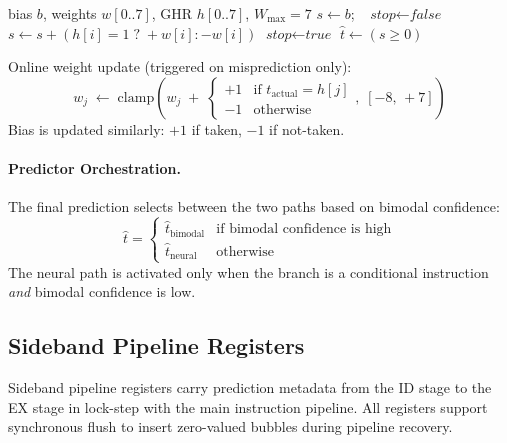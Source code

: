 \documentclass[12pt,a4paper]{article}
\begin{document}
\begin{algorithm}[htbp]
\caption{Perceptron inference with hardware early stopping. In the RTL
  implementation, the full combinational tree is computed in parallel and
  the result is registered after one clock cycle; the early-stop condition
  reduces switching activity within the combinational path.}
\label{alg:earlystop}
\begin{algorithmic}[1]
\Require bias $b$, weights $w[0..7]$, GHR $h[0..7]$, $W_{\max}=7$
\State $s \leftarrow b$; \ $\textit{stop} \leftarrow \textit{false}$
    \State $s \leftarrow s + (h[i]=1 \;?\; +w[i] : -w[i])$
      \State $\textit{stop} \leftarrow \textit{true}$ 
    \EndIf
  \EndIf
\EndFor
\State \Return $\hat{t} \leftarrow (s \geq 0)$
\end{algorithmic}
\end{algorithm}

Online weight update (triggered on misprediction only):
\[
  w_j \;\leftarrow\; \mathrm{clamp}\!\left(
    w_j \;+\; \begin{cases}
      +1 & \text{if } t_{\mathrm{actual}} = h[j] \\
      -1 & \text{otherwise}
    \end{cases},\;
    [-8,\,+7]
  \right)
\]
Bias is updated similarly: $+1$ if taken, $-1$ if not-taken.

\paragraph{Predictor Orchestration.}
The final prediction selects between the two paths based on bimodal confidence:
\[
  \hat{t} =
  \begin{cases}
    \hat{t}_{\text{bimodal}} & \text{if bimodal confidence is high} \\
    \hat{t}_{\text{neural}}  & \text{otherwise}
  \end{cases}
\]
The neural path is activated only when the branch is a conditional instruction
\emph{and} bimodal confidence is low.

\subsection{Sideband Pipeline Registers}
\label{sec:sideband}

Sideband pipeline registers carry prediction metadata from the ID stage to
the EX stage in lock-step with the main instruction pipeline.
All registers support synchronous flush to insert zero-valued bubbles
during pipeline recovery.
\end{document}
